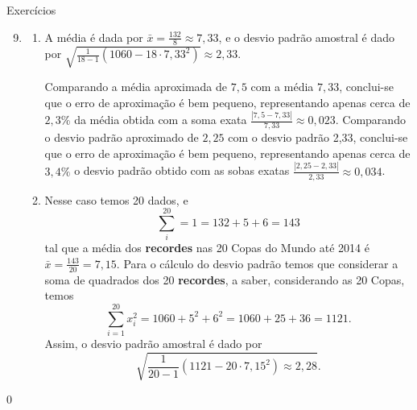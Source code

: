 \begin{answer}{Exercícios}
{\exerciselist
  \begin{enumerate}\setcounter{enumi}{8}
  \item 
  \begin{enumerate}
  \item A média é dada por $\bar{x}=\frac{132}{8}\approx7{,}33$, e o desvio padrão amostral é dado por $\displaystyle\sqrt{\frac{1}{18-1}(1060-18\cdot7{,}33^2)}\approx 2{,}33$.

  Comparando a média aproximada de $7{,}5$ com a média $7{,}33$, conclui-se que o erro de aproximação é bem pequeno, representando apenas cerca de $2{,}3$\% da média obtida com a soma exata $\frac{|7{,}5-7{,}33|}{7{,}33}\approx0{,}023$. Comparando o desvio padrão aproximado de $2{,}25$ com o desvio padrão 2{,}33, conclui-se que o erro de aproximação é bem pequeno, representando apenas cerca de $3{,}4\%$ o desvio padrão obtido com as sobas exatas $\frac{|2{,}25-2{,}33|}{2{,}33}\approx0{,}034$.
  \item Nesse caso temos 20 dados, e
  \begin{equation*}
  \sum^{20}_i=1=132+5+6=143
  \end{equation*}
  tal que a média dos \textbf{recordes} nas 20 Copas do Mundo até 2014 
  é $\bar{x}=\frac{143}{20}=7{,}15$. Para o cálculo do desvio padrão temos que considerar a soma de quadrados dos 20 \textbf{recordes}, a saber, considerando as 20 Copas, temos
  \begin{equation*}
  \sum^{20}_{i=1}x^2_i=1060+5^2+6^2=1060+25+36=1121.
  \end{equation*}
  Assim, o desvio padrão amostral é dado por
  \begin{equation*}
  \sqrt{\frac{1}{20-1}(1121-20\cdot7{,}15^2)\approx2{,}28}.
  \end{equation*}
  \end{enumerate}
  \end{enumerate}
}{0}
\end{answer}
\clearmargin

